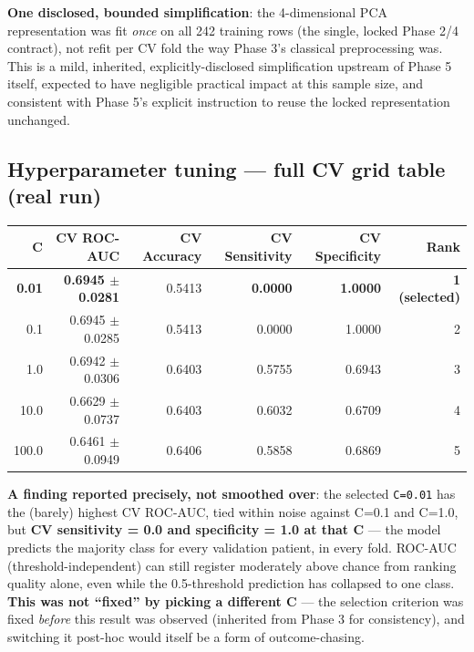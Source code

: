 \documentclass[11pt,a4paper]{article}
\newcommand{\code}[1]{\texttt{\small #1}}
\begin{document}
\textbf{One disclosed, bounded simplification}: the 4-dimensional PCA representation was fit \emph{once} on all 242 training rows (the single, locked Phase 2/4 contract), not refit per CV fold the way Phase 3's classical preprocessing was. This is a mild, inherited, explicitly-disclosed simplification upstream of Phase 5 itself, expected to have negligible practical impact at this sample size, and consistent with Phase 5's explicit instruction to reuse the locked representation unchanged.

\subsection{Hyperparameter tuning --- full CV grid table (real run)}
\begin{center}
\small
\begin{tabular}{@{}rrrrrr@{}}
\toprule
\textbf{C} & \textbf{CV ROC-AUC} & \textbf{CV Accuracy} & \textbf{CV Sensitivity} & \textbf{CV Specificity} & \textbf{Rank} \\
\midrule
\textbf{0.01} & \textbf{0.6945 $\pm$ 0.0281} & 0.5413 & \textbf{0.0000} & \textbf{1.0000} & \textbf{1 (selected)} \\
0.1 & 0.6945 $\pm$ 0.0285 & 0.5413 & 0.0000 & 1.0000 & 2 \\
1.0 & 0.6942 $\pm$ 0.0306 & 0.6403 & 0.5755 & 0.6943 & 3 \\
10.0 & 0.6629 $\pm$ 0.0737 & 0.6403 & 0.6032 & 0.6709 & 4 \\
100.0 & 0.6461 $\pm$ 0.0949 & 0.6406 & 0.5858 & 0.6869 & 5 \\
\bottomrule
\end{tabular}
\end{center}

\textbf{A finding reported precisely, not smoothed over}: the selected \code{C=0.01} has the (barely) highest CV ROC-AUC, tied within noise against C=0.1 and C=1.0, but \textbf{CV sensitivity = 0.0 and specificity = 1.0 at that C} --- the model predicts the majority class for every validation patient, in every fold. ROC-AUC (threshold-independent) can still register moderately above chance from ranking quality alone, even while the 0.5-threshold prediction has collapsed to one class. \textbf{This was not ``fixed'' by picking a different C} --- the selection criterion was fixed \emph{before} this result was observed (inherited from Phase 3 for consistency), and switching it post-hoc would itself be a form of outcome-chasing.
\end{document}
